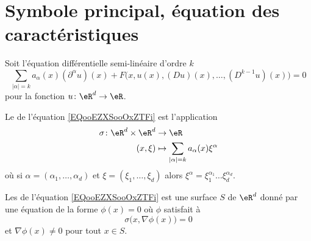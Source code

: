 
\section{Symbole principal, équation des caractéristiques}

Soit l'équation différentielle semi-linéaire d'ordre \( k\)
\begin{equation}        \label{EQooEZXSooOxZTFi}
    \sum_{| \alpha |=k}a_{\alpha}(x)(\partial^{\alpha}u)(x)+F\Big( x,u(x),(Du)(x),\ldots, (D^{k-1}u)(x) \Big)=0
\end{equation}
pour la fonction \( u\colon \eR^d\to \eR\).

\begin{definition}
    Le  de l'équation \eqref{EQooEZXSooOxZTFi} est l'application 
    \begin{equation}
        \begin{aligned}
            \sigma\colon \eR^d\times \eR^d&\to \eR \\
            (x,\xi)&\mapsto \sum_{| \alpha |=k}a_{\alpha}(x)\xi^{\alpha} 
        \end{aligned}
    \end{equation}
    où si \( \alpha=(\alpha_1,\ldots, \alpha_d)\) et \( \xi=(\xi_1,\ldots, \xi_d)\) alors \( \xi^{\alpha}=\xi_1^{\alpha_1}\ldots\xi_d^{\alpha_d}\).
\end{definition}

\begin{definition}      \label{DEFooYYNOooZlZMxu}
    Les  de l'équation \eqref{EQooEZXSooOxZTFi} est une surface \( S\) de \( \eR^d\) donné par une équation de la forme \( \phi(x)=0\) où \( \phi\) satisfait à
    \begin{equation}
        \sigma\big( x,\nabla\phi(x) \big)=0
    \end{equation}
    et \( \nabla\phi(x)\neq 0\) pour tout \( x\in S\).
\end{definition}

